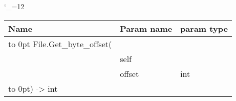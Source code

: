 \begingroup \catcode`\_=12 \tt
\begin{tabular}{lll}
\toprule
\textrm{Name}&\textrm{Param name}&\textrm{param type}\\
\midrule
\hbox to 0pt {File.Get_byte_offset(\hss}\\
& self\\
& offset & int\\
\hbox to 0pt{) -> int\hss}\\
\bottomrule
\end{tabular}
\endgroup
